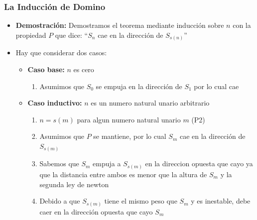 \documentclass{beamer}
\begin{document}
\begin{frame}
    \frametitle{La Inducci\'on de Domino}
    \begin{itemize}
        \item{{\bf Demostraci\'on: }Demostramos el teorema mediante inducci\'on
        sobre $n$ con la propiedad $P$ que dice: ``$S_n$ cae en la direcci\'on de $S_{s(n)}$''}
        \item{Hay que considerar dos casos:
            \begin{itemize}
                \item{{\bf Caso base: } $n$ es cero
                \begin{enumerate}
                    \item{Asumimos que $S_0$ se empuja en la direcci\'on de $S_1$ por lo cual cae}
                \end{enumerate}
                }
                \item{{\bf Caso inductivo: }$n$ es un numero natural unario arbitrario
                \begin{enumerate}
                    \item{$n=s(m)$ para algun numero natural unario $m$ (P2)}
                    \item{Asumimos que $P$ se mantiene, por lo cual $S_m$
                    cae en la direcci\'on de $S_{s(m)}$}
                    \item{Sabemos que $S_m$ empuja a $S_{s(m)}$ en la direccion opuesta que
                    cayo ya que la distancia entre ambos es menor que la altura de $S_m$ y la
                    segunda ley de newton}
                    \item{Debido a que $S_{s(m)}$ tiene el mismo peso que $S_m$ y es inestable,
                    debe caer en la direcci\'on opuesta que cayo $S_m$}
                \end{enumerate}
                }
            \end{itemize}
        }
    \end{itemize}
\end{frame}
\end{document}
